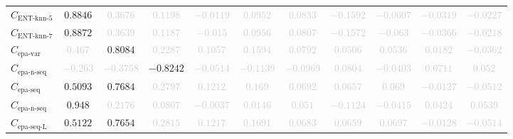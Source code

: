 \documentclass{standalone}
\newcommand{\entknnfivename}{\text{ENT-knn-5}}
\newcommand{\entknnfive}{C_{\entknnfivename}}
\newcommand{\entknnsevenname}{\text{ENT-knn-7}}
\newcommand{\entknnseven}{C_{\entknnsevenname}}
\newcommand{\epavariantname}{\text{epa-var}}
\newcommand{\epavariant}{C_{\epavariantname}}
\newcommand{\epanormvariant}{C_{\epanormsequencename}}
\newcommand{\epasequencename}{\text{epa-seq}}
\newcommand{\epasequence}{C_{\epasequencename}}
\newcommand{\epanormsequencename}{\text{epa-n-seq}}
\newcommand{\epanormsequence}{C_{\epanormsequencename}}
\newcommand{\epasequencelname}{\text{epa-seq-L}}
\newcommand{\epasequencel}{C_{\epasequencelname}}
\begin{document}
\begin{tabular}{lcccccccccc}
$\entknnfive$ & $0.8846$ & \textcolor{lightgray}{$0.3676$} & \textcolor{lightgray}{$0.1198$} & \textcolor{lightgray}{$-0.0119$} & \textcolor{lightgray}{$0.0952$} & \textcolor{lightgray}{$0.0833$} & \textcolor{lightgray}{$-0.1592$} & \textcolor{lightgray}{$-0.0607$} & \textcolor{lightgray}{$-0.0319$} & \textcolor{lightgray}{$-0.0227$} \\ 
$\entknnseven$ & $0.8872$ & \textcolor{lightgray}{$0.3639$} & \textcolor{lightgray}{$0.1187$} & \textcolor{lightgray}{$-0.015$} & \textcolor{lightgray}{$0.0956$} & \textcolor{lightgray}{$0.0807$} & \textcolor{lightgray}{$-0.1572$} & \textcolor{lightgray}{$-0.063$} & \textcolor{lightgray}{$-0.0366$} & \textcolor{lightgray}{$-0.0218$} \\ 
$\epavariant$ & \textcolor{lightgray}{$0.467$} & $0.8084$ & \textcolor{lightgray}{$0.2287$} & \textcolor{lightgray}{$0.1057$} & \textcolor{lightgray}{$0.1594$} & \textcolor{lightgray}{$0.0792$} & \textcolor{lightgray}{$0.0506$} & \textcolor{lightgray}{$0.0536$} & \textcolor{lightgray}{$0.0182$} & \textcolor{lightgray}{$-0.0362$} \\ 
$\epanormvariant$ & \textcolor{lightgray}{$-0.263$} & \textcolor{lightgray}{$-0.3758$} & $-0.8242$ & \textcolor{lightgray}{$-0.0514$} & \textcolor{lightgray}{$-0.1139$} & \textcolor{lightgray}{$-0.0969$} & \textcolor{lightgray}{$0.0804$} & \textcolor{lightgray}{$-0.0403$} & \textcolor{lightgray}{$0.0711$} & \textcolor{lightgray}{$0.052$} \\ 
$\epasequence$ & $0.5093$ & $0.7684$ & \textcolor{lightgray}{$0.2797$} & \textcolor{lightgray}{$0.1212$} & \textcolor{lightgray}{$0.169$} & \textcolor{lightgray}{$0.0692$} & \textcolor{lightgray}{$0.0657$} & \textcolor{lightgray}{$0.069$} & \textcolor{lightgray}{$-0.0127$} & \textcolor{lightgray}{$-0.0512$} \\ 
$\epanormsequence$ & $0.948$ & \textcolor{lightgray}{$0.2176$} & \textcolor{lightgray}{$0.0807$} & \textcolor{lightgray}{$-0.0037$} & \textcolor{lightgray}{$0.0146$} & \textcolor{lightgray}{$0.051$} & \textcolor{lightgray}{$-0.1124$} & \textcolor{lightgray}{$-0.0415$} & \textcolor{lightgray}{$0.0424$} & \textcolor{lightgray}{$0.0539$} \\ 
$\epasequencel$ & $0.5122$ & $0.7654$ & \textcolor{lightgray}{$0.2815$} & \textcolor{lightgray}{$0.1217$} & \textcolor{lightgray}{$0.1691$} & \textcolor{lightgray}{$0.0683$} & \textcolor{lightgray}{$0.0659$} & \textcolor{lightgray}{$0.0697$} & \textcolor{lightgray}{$-0.0128$} & \textcolor{lightgray}{$-0.0514$} \\ 

\end{tabular}
\end{document}
